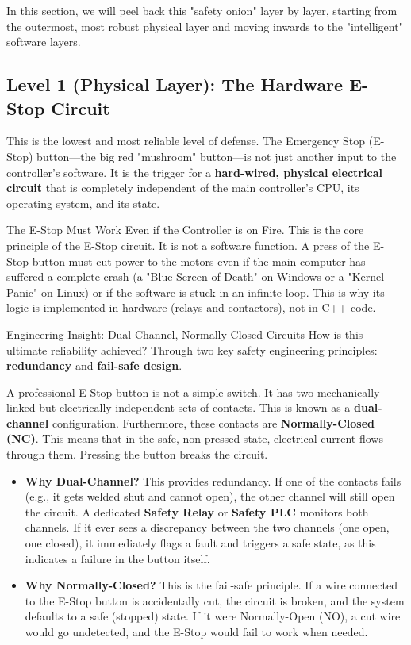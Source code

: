 In this section, we will peel back this "safety onion" layer by layer, starting from the outermost, most robust physical layer and moving inwards to the "intelligent" software layers.

\subsection{Level 1 (Physical Layer): The Hardware E-Stop Circuit}
\label{subsec:level1_estop}

This is the lowest and most reliable level of defense. The Emergency Stop (E-Stop) button—the big red "mushroom" button—is not just another input to the controller's software. It is the trigger for a \textbf{hard-wired, physical electrical circuit} that is completely independent of the main controller's CPU, its operating system, and its state.

\begin{principlebox}{The E-Stop Must Work Even if the Controller is on Fire.}
    This is the core principle of the E-Stop circuit. It is not a software function. A press of the E-Stop button must cut power to the motors even if the main computer has suffered a complete crash (a "Blue Screen of Death" on Windows or a "Kernel Panic" on Linux) or if the software is stuck in an infinite loop. This is why its logic is implemented in hardware (relays and contactors), not in C++ code.
\end{principlebox}

\begin{tipbox}{Engineering Insight: Dual-Channel, Normally-Closed Circuits}
How is this ultimate reliability achieved? Through two key safety engineering principles: \textbf{redundancy} and \textbf{fail-safe design}.

A professional E-Stop button is not a simple switch. It has two mechanically linked but electrically independent sets of contacts. This is known as a \textbf{dual-channel} configuration. Furthermore, these contacts are \textbf{Normally-Closed (NC)}. This means that in the safe, non-pressed state, electrical current flows through them. Pressing the button breaks the circuit.

\begin{itemize}
    \item \textbf{Why Dual-Channel?} This provides redundancy. If one of the contacts fails (e.g., it gets welded shut and cannot open), the other channel will still open the circuit. A dedicated \textbf{Safety Relay} or \textbf{Safety PLC} monitors both channels. If it ever sees a discrepancy between the two channels (one open, one closed), it immediately flags a fault and triggers a safe state, as this indicates a failure in the button itself.
    \item \textbf{Why Normally-Closed?} This is the fail-safe principle. If a wire connected to the E-Stop button is accidentally cut, the circuit is broken, and the system defaults to a safe (stopped) state. If it were Normally-Open (NO), a cut wire would go undetected, and the E-Stop would fail to work when needed.
\end{itemize}
\end{tipbox}

